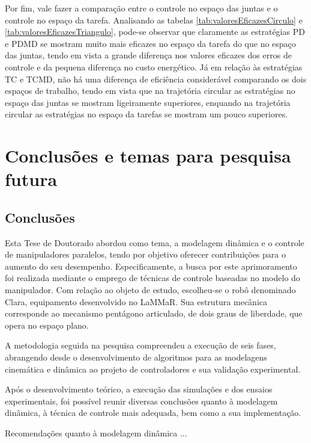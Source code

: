 \documentclass[]{politex}
\begin{document}
Por fim, vale fazer a comparação entre o controle no espaço das juntas e o controle no espaço da tarefa. Analisando as tabelas \ref{tab:valoresEficazesCirculo} e \ref{tab:valoresEficazesTriangulo}, pode-se observar que claramente as estratégias PD e PDMD se mostram muito mais eficazes no espaço da tarefa do que no espaço das juntas, tendo em vista a grande diferença nos valores eficazes dos erros de controle e da pequena diferença no custo energético. Já em relação às estratégias TC e TCMD, não há uma diferença de eficiência considerável comparando os dois espaços de trabalho, tendo em vista que na trajetória circular as estratégias no espaço das juntas se mostram ligeiramente superiores, enquando na trajetória circular as estratégias no espaço da tarefas se mostram um pouco superiores.




\chapter{Conclusões e temas para pesquisa futura}

\section{Conclusões}

Esta Tese de Doutorado abordou como tema, a modelagem dinâmica e o controle de manipuladores paralelos, tendo por objetivo oferecer contribuições para o aumento do seu desempenho. Especificamente, a busca por este aprimoramento foi realizada mediante o emprego de técnicas de controle baseadas no modelo do manipulador. Com relação ao objeto de estudo, escolheu-se o robô denominado Clara, equipamento desenvolvido no LaMMaR. Sua estrutura mecânica corresponde ao mecanismo pentágono articulado, de dois graus de liberdade, que opera no espaço plano. 

A metodologia seguida na pesquisa compreendeu a execução de seis fases, abrangendo desde o desenvolvimento de algoritmos para as modelagens cinemática e dinâmica ao projeto de controladores e sua validação experimental.

Após o desenvolvimento teórico, a execução das simulações e dos ensaios experimentais, foi possível reunir diversas conclusões quanto à modelagem dinâmica, à técnica de controle mais adequada, bem como a sua implementação.

Recomendações quanto à modelagem dinâmica ...
\end{document}
